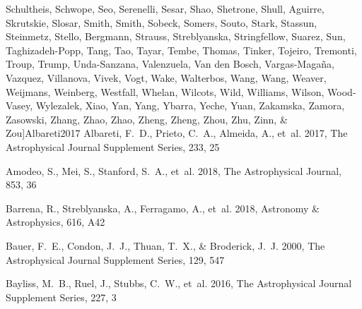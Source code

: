 \documentclass[apj, revtex4-1]{emulateapj}
\begin{document}
\begin{thebibliography}{}
{  Schultheis, Schwope, Seo, Serenelli, Sesar, Shao, Shetrone, Shull, Aguirre,
  Skrutskie, Slosar, Smith, Smith, Sobeck, Somers, Souto, Stark, Stassun,
  Steinmetz, Stello, Bergmann, Strauss, Streblyanska, Stringfellow, Suarez,
  Sun, Taghizadeh-Popp, Tang, Tao, Tayar, Tembe, Thomas, Tinker, Tojeiro,
  Tremonti, Troup, Trump, Unda-Sanzana, Valenzuela, {Van den Bosch},
  Vargas-Maga{\~{n}}a, Vazquez, Villanova, Vivek, Vogt, Wake, Walterbos, Wang,
  Wang, Weaver, Weijmans, Weinberg, Westfall, Whelan, Wilcots, Wild, Williams,
  Wilson, Wood-Vasey, Wylezalek, Xiao, Yan, Yang, Ybarra, Yeche, Yuan,
  Zakamska, Zamora, Zasowski, Zhang, Zhao, Zhao, Zheng, Zheng, Zhou, Zhu, Zinn,
  \& Zou}]{Albareti2017}
Albareti, F.~D., Prieto, C.~A., Almeida, A., {et~al.} 2017, The Astrophysical
  Journal Supplement Series, 233, 25

Amodeo, S., Mei, S., Stanford, S.~A., {et~al.} 2018, The Astrophysical Journal,
  853, 36

Barrena, R., Streblyanska, A., Ferragamo, A., {et~al.} 2018, Astronomy {\&}
  Astrophysics, 616, A42

Bauer, F.~E., Condon, J.~J., Thuan, T.~X., \& Broderick, J.~J. 2000, The
  Astrophysical Journal Supplement Series, 129, 547

Bayliss, M.~B., Ruel, J., Stubbs, C.~W., {et~al.} 2016, The Astrophysical
  Journal Supplement Series, 227, 3


\end{thebibliography}
\end{document}
